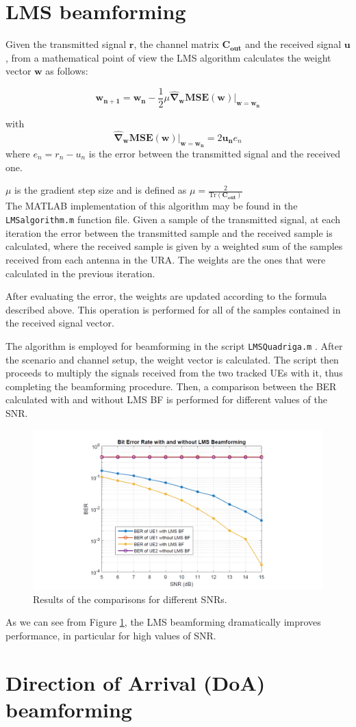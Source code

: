 \documentclass[a4paper,10pt]{article}
\begin{document}
\section{LMS beamforming}
Given the transmitted signal $\mathbf{r}$, the channel matrix $\mathbf{C_{out}}$ and the received signal $\mathbf{u}$, from a mathematical point of view the LMS algorithm calculates the weight vector $\mathbf{w}$ as follows:

$$ \mathbf{w_{n+1}} = \mathbf{w_{n}}-\frac{1}{2}\mu \mathbf{\widehat{\nabla}_w MSE}(\mathbf{w})|_{\mathbf{w=w_n}} $$

with $$\mathbf{\widehat{\nabla}_w MSE}(\mathbf{w})|_{\mathbf{w=w_n}} = 2\mathbf{u_n}e_n$$ 
where $e_n = r_n - u_n$ is the error between the transmitted signal and the received one.

\noindent $\mu$ is the gradient step size and is defined as $\displaystyle \mu = \frac{2}{\mathrm{Tr}(\mathbf{C_{out}})}$ \\

The MATLAB implementation of this algorithm may be found in the \texttt{LMSalgorithm.m} function file. Given a sample of the transmitted signal, at each iteration the error between the transmitted sample and the received sample is calculated, where the received sample is given by a weighted sum of the samples received from each antenna in the URA. The weights are the ones that were calculated in the previous iteration. 

After evaluating the error, the weights are updated according to the formula described above. This operation is performed for all of the samples contained in the received signal vector.

The algorithm is employed for beamforming in the script \texttt{LMSQuadriga.m} . After the scenario and channel setup, the weight vector is calculated. The script then proceeds to multiply the signals received from the two tracked UEs with it, thus completing the beamforming procedure. Then, a comparison between the BER calculated with and without LMS BF is performed for different values of the SNR.

\begin{figure}[H]
	\centering
	\includegraphics[width=\linewidth]{bersnr.png}
	\caption{\label{fig:bersnr}Results of the comparisons for different SNRs.}
\end{figure}
As we can see from Figure \ref{fig:bersnr}, the LMS beamforming dramatically improves performance, in particular for high values of SNR.
\section{Direction of Arrival (DoA) beamforming}
\end{document}
